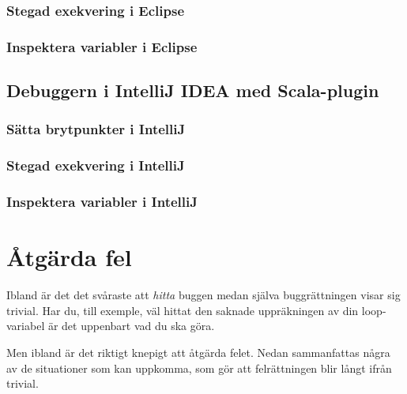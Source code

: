\subsubsection{Stegad exekvering i Eclipse}
\subsubsection{Inspektera variabler i Eclipse}

\subsection{Debuggern i IntelliJ IDEA med Scala-plugin}
\subsubsection{Sätta brytpunkter i IntelliJ}
\subsubsection{Stegad exekvering i IntelliJ}
\subsubsection{Inspektera variabler i IntelliJ}



\section{Åtgärda fel}

Ibland är det det svåraste att \emph{hitta} buggen medan själva buggrättningen visar sig trivial. Har du, till exemple, väl hittat den saknade uppräkningen av din loop-variabel är det uppenbart vad du ska göra.

Men ibland är det riktigt knepigt att åtgärda felet. Nedan sammanfattas några av de situationer som kan uppkomma, som gör att felrättningen blir långt ifrån trivial. 

